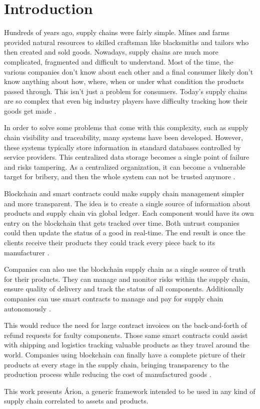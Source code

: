\section{Introduction} \label{sec:Introduction}

Hundreds of years ago, supply chains were fairly simple. Mines and farms provided natural resources to skilled craftsman like blacksmiths and tailors who then created and sold goods. Nowadays, supply chains are much more complicated, fragmented and difficult to understand. Most of the time, the various companies don't know about each other and a final consumer likely don't know anything about how, where, when or under what condition the products passed through. This isn't just a problem for consumers. Today's supply chains are so complex that even big industry players have difficulty tracking how their goods get made \cite{swan2015blockchain}.


In order to solve some problems that come with this complexity, such as supply chain visibility and traceability, many systems have been developed. However, these systems typically store information in standard databases controlled by service providers. This centralized data storage becomes a single point of failure and risks tampering. As a centralized organization, it can become a vulnerable target for bribery, and then the whole system can not be trusted anymore \cite{tian2017supply}.

Blockchain and smart contracts could make supply chain management simpler and more transparent. The idea is to create a single source of information about products and supply chain via global ledger. Each component would have its own entry on the blockchain that gets tracked over time. Both untrust companies could then update the status of a good in real-time. The end result is once the clients receive their products they could track every piece back to its manufacturer \cite{greve2018blockchain}.

Companies can also use the blockchain supply chain as a single source of truth for their products. They can manage and monitor risks within the supply chain, ensure quality of delivery and track the status of all components. Additionally companies can use smart contracts to manage and pay for supply chain autonomously \cite{tian2017supply}. 

This would reduce the need for large contract invoices on the back-and-forth of refund requests for faulty components. Those same smart contracts could assist with shipping and logistics tracking valuable products as they travel around the world. Companies using blockchain can finally have a complete picture of their products at every stage in the supply chain, bringing transparency to the production process while reducing the cost of manufactured goods  \cite{swan2015blockchain}.

This work presents Árion, a generic framework intended to be used in any kind of supply chain correlated to assets and products.